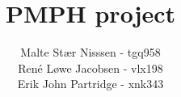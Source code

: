 \documentclass[12pt, oneside]{article}
\title{PMPH project}
\author{Malte Stær Nisssen - tgq958 \\René Løwe Jacobsen - vlx198 \\ Erik John Partridge - xnk343}
\begin{document}
\maketitle

\section{}

\printbibliography
\end{document}

